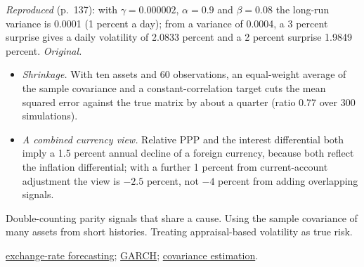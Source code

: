 \begin{qfmethod}
 \emph{Reproduced} (p.~137): with $\gamma=0.000002$, $\alpha=0.9$ and $\beta=0.08$ the long-run variance is 0.0001 (1 percent a day); from a variance of 0.0004, a 3 percent surprise gives a daily volatility of 2.0833 percent and a 2 percent surprise 1.9849 percent. \emph{Original.}
\begin{itemize}
\item \emph{Shrinkage.} With ten assets and 60 observations, an equal-weight average of the sample covariance and a constant-correlation target cuts the mean squared error against the true matrix by about a quarter (ratio 0.77 over 300 simulations).
\item \emph{A combined currency view.} Relative PPP and the interest differential both imply a 1.5 percent annual decline of a foreign currency, because both reflect the inflation differential; with a further 1 percent from current-account adjustment the view is $-2.5$ percent, not $-4$ percent from adding overlapping signals.
\end{itemize}

 Double-counting parity signals that share a cause. Using the sample covariance of many assets from short histories. Treating appraisal-based volatility as true risk.

 \hyperref[meth:exchange-rate-forecasting-fair-value]{exchange-rate forecasting}; \hyperref[mod:garch-volatility-forecast]{GARCH}; \hyperref[meth:portfolio-covariance-estimation]{covariance estimation}.

\end{qfmethod}

